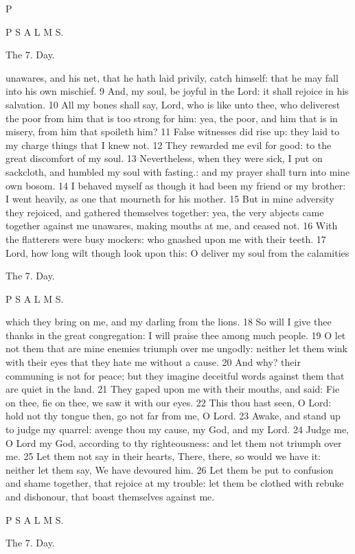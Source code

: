 P

P S A L M S.

The 7. Day.

unawares, and his net, that he hath laid privily, catch himself: that he may fall into his own mischief. 9 And, my soul, be joyful in the Lord: it shall rejoice in his salvation. 10 All my bones shall say, Lord, who is like unto thee, who deliverest the poor from him that is too strong for him: yea, the poor, and him that is in misery, from him that spoileth him? 11 False witnesses did rise up: they laid to my charge things that I knew not. 12 They rewarded me evil for good: to the great discomfort of my soul. 13 Nevertheless, when they were sick, I put on sackcloth, and humbled my soul with fasting.: and my prayer shall turn into mine own bosom. 14 I behaved myself as though it had been my friend or my brother: I went heavily, as one that mourneth for his mother. 15 But in mine adversity they rejoiced, and gathered themselves together: yea, the very abjects came together against me unawares, making mouths at me, and ceased not. 16 With the flatterers were busy mockers: who gnashed upon me with their teeth. 17 Lord, how long wilt though look upon this: O deliver my soul from the calamities

The 7. Day.

P S A L M S.

which they bring on me, and my darling from the lions. 18 So will I give thee thanks in the great congregation: I will praise thee among much people. 19 O let not them that are mine enemies triumph over me ungodly: neither let them wink with their eyes that they hate me without a cause. 20 And why? their communing is not for peace; but they imagine deceitful words against them that are quiet in the land. 21 They gaped upon me with their mouths, and said: Fie on thee, fie on thee, we saw it with our eyes. 22 This thou hast seen, O Lord: hold not thy tongue then, go not far from me, O Lord. 23 Awake, and stand up to judge my quarrel: avenge thou my cause, my God, and my Lord. 24 Judge me, O Lord my God, according to thy righteousness: and let them not triumph over me. 25 Let them not say in their hearts, There, there, so would we have it: neither let them say, We have devoured him. 26 Let them be put to confusion and shame together, that rejoice at my trouble: let them be clothed with rebuke and dishonour, that boast themselves against me.

P S A L M S.

The 7. Day.

